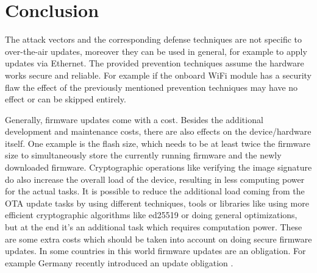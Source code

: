 \section{Conclusion}
The attack vectors and the corresponding defense techniques are not specific to over-the-air updates, moreover they can be used in general, for example to apply updates via Ethernet. The provided prevention techniques assume the hardware works secure and reliable. For example if the onboard WiFi module has a security flaw the effect of the previously mentioned prevention techniques may have no effect or can be skipped entirely.

\bigskip
Generally, firmware updates come with a cost. Besides the additional development and maintenance costs, there are also effects on the device/hardware itself. One example is the flash size, which needs to be at least twice the firmware size to simultaneously store the currently running firmware and the newly downloaded firmware. Cryptographic operations like verifying the image signature do also increase the overall load of the device, resulting in less computing power for the actual tasks. It is possible to reduce the additional load coming from the OTA update tasks by using different techniques, tools or libraries like using more efficient cryptographic algorithms like ed25519 or doing general optimizations, but at the end it's an additional task which requires computation power. These are some extra costs which should be taken into account on doing secure firmware updates. In some countries in this world firmware updates are an obligation. For example Germany recently introduced an update obligation \cite{Koltzsch2021}.
